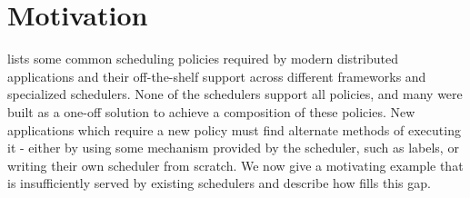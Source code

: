 \section{Motivation}
\label{sec:motivation}




 lists some common scheduling policies required by modern distributed applications and their off-the-shelf support across different frameworks and specialized schedulers. 
None of the schedulers support all policies, and many were built as a one-off solution to achieve a composition of these policies. 
New applications which require a new policy must find alternate methods of executing it - either by using some mechanism provided by the scheduler, such as labels, or writing their own scheduler from scratch. %
We now give a motivating example that is insufficiently served by existing schedulers and describe how \name{} fills this gap.

